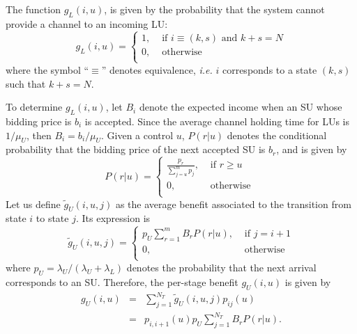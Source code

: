 The function $g_{L}(i,u)$, is given by the probability that the system cannot provide a channel to an incoming LU:
\begin{equation} \label{gLpriority}
	  g_{L}(i,u) =
	  \begin{cases}
		1,& \text{ if }i \equiv (k,s) \text{ and } k+s = N\\	 
		0,& \text{ otherwise} \\
 \end{cases}
\end{equation}
where the symbol ``$\equiv$'' denotes equivalence, \textit{i.e.} $i$ corresponds to a state $(k,s)$ such that $k+s = N$.

To determine $g_{L}(i,u)$, let $B_{i}$ denote the expected income when an SU whose bidding price is $b_{i}$ is accepted. Since the average channel holding time for LUs is $1/\mu_{U}$, then $B_{i} = b_{i}/\mu_{U}$.
Given a control $u$, $P\left(r | u\right)$ denotes the conditional probability that the bidding price of the next accepted SU is $b_{r}$, and is given by
\begin{equation}
	  P\left(r |u\right) =
	  \begin{cases}
		\displaystyle\frac{p_{r}}{\sum^{m}_{j = u}p_{j}}, & \text{ if }r \geq u\\	
		0, & \text{ otherwise } \\
 \end{cases}
\end{equation}
Let us define $\tilde{g}_{U}(i,u,j)$ as the average benefit associated to the transition from state $i$ to state $j$. Its expression is
\begin{equation}
	  \tilde{g}_{U}(i,u,j) =
	  \begin{cases}
		p_{U}\sum^{m}_{r = 1}B_{r}P\left(r | u\right), & \text{ if }j = i+1\\	
		0, & \text{ otherwise} \\
 \end{cases}
\end{equation}
where $p_{U} = \lambda_{U}/(\lambda_{U}+\lambda_{L})$ denotes the probability that the next arrival corresponds to an SU.
Therefore, the per-stage benefit $g_{U}(i,u)$ is given by
\begin{equation}\label{gUauction}
\begin{array}{lcl}
g_{U}(i,u) & = & \sum^{N_{T}}_{j = 1}\tilde{g}_{U}(i,u,j)p_{ij}(u)\\
					& = & p_{i,i+1}(u)p_{U}\sum^{N_{T}}_{j = 1}B_{r}P\left(r |u\right).
	\end{array}
\end{equation}

